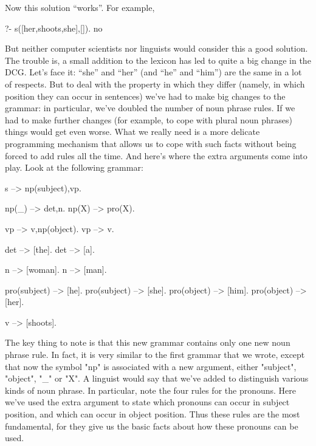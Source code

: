 Now this solution ``works''. For example,
\begin{LPNcodedisplay}
?- s([her,shoots,she],[]).
no
\end{LPNcodedisplay}

But neither computer scientists nor linguists would consider this a
good solution.  The trouble is, a small addition to the lexicon has
led to quite a big change in the DCG. Let's face it: ``she'' and
``her'' (and ``he'' and ``him'') are the same in a lot of respects.
But to deal with the property in which they differ (namely, in which
position they can occur in sentences) we've had to make big changes to
the grammar: in particular, we've doubled the number of noun phrase
rules.  If we had to make further changes (for example, to cope with
plural noun phrases) things would get even worse.  What we really need
is a more delicate programming mechanism that allows us to cope with
such facts without being forced to add rules all the time.  And here's
where the extra arguments come into play.  Look at the following
grammar:

\begin{LPNcodedisplay}
s --> np(subject),vp.

np(_) --> det,n.
np(X) --> pro(X).

vp --> v,np(object).
vp --> v.

det --> [the].
det --> [a].

n --> [woman].
n --> [man].

pro(subject) --> [he].
pro(subject) --> [she].
pro(object) --> [him].
pro(object) --> [her].

v --> [shoots].
\end{LPNcodedisplay}




The key thing to note is that this new grammar contains only one new
noun phrase rule.  In fact, it is very similar to the first grammar
that we wrote, except that now the symbol "np" is associated with a
new argument, either "subject", "object", "\_" or "X".  A
linguist would say that we've added  to distinguish
various kinds of noun phrase.  In particular, note the four rules for
the pronouns. Here we've used the extra argument to state which
pronouns can occur in subject position, and which can occur in object
position. Thus these rules are the most fundamental, for they give us
the basic facts about how these pronouns can be used.

